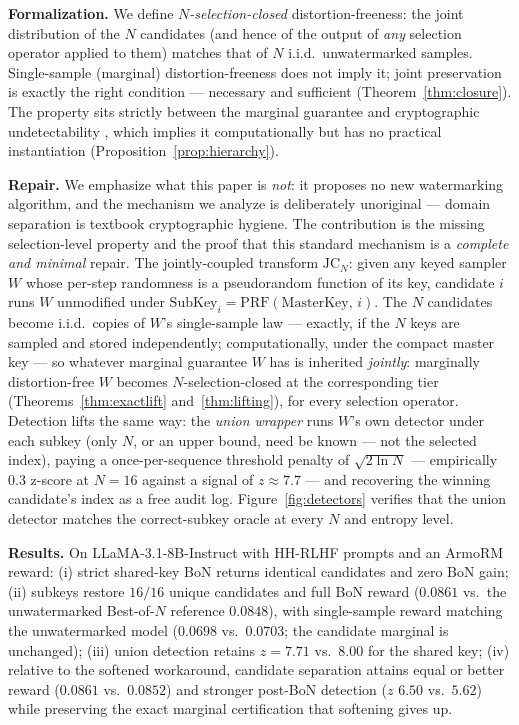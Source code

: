 \documentclass{article} %
\begin{document}
\textbf{Formalization.} We define \emph{$N$-selection-closed} distortion-freeness:
the joint distribution of the $N$ candidates (and hence of the output of \emph{any}
selection operator applied to them) matches that of $N$ i.i.d.\ unwatermarked samples.
Single-sample (marginal) distortion-freeness does not imply it; joint
preservation is exactly the right condition --- necessary and sufficient
(Theorem~\ref{thm:closure}). The property sits strictly between the marginal guarantee and cryptographic
undetectability \citep{christ2023undetectable}, which implies it
computationally but has no practical instantiation
(Proposition~\ref{prop:hierarchy}).

\textbf{Repair.} We emphasize what this paper is \emph{not}: it proposes no
new watermarking algorithm, and the mechanism we analyze is deliberately
unoriginal --- domain separation is textbook cryptographic hygiene. The
contribution is the missing selection-level property and the proof that this
standard mechanism is a \emph{complete and minimal} repair. The jointly-coupled
transform $\mathrm{JC}_N$: given any keyed sampler $W$ whose per-step
randomness is a pseudorandom function of its key, candidate $i$ runs $W$
unmodified under $\mathrm{SubKey}_i=\mathrm{PRF}(\mathrm{MasterKey},\,i)$.
The $N$ candidates become i.i.d.\ copies of $W$'s single-sample law ---
exactly, if the $N$ keys are sampled and stored independently;
computationally, under the compact master key --- so whatever marginal
guarantee $W$ has is inherited \emph{jointly}: marginally distortion-free $W$
becomes $N$-selection-closed at the corresponding tier
(Theorems~\ref{thm:exactlift} and~\ref{thm:lifting}), for every selection
operator.
Detection lifts the same way: the \emph{union wrapper} runs $W$'s own detector
under each subkey (only $N$, or an upper bound, need be known --- not the
selected index), paying a once-per-sequence threshold penalty of
$\sqrt{2\ln N}$ --- empirically $0.3$ z-score at $N{=}16$ against a signal of
$z\approx7.7$ --- and recovering the winning candidate's index as a free audit
log. Figure~\ref{fig:detectors} verifies that the union detector matches the
correct-subkey oracle at every $N$ and entropy level.

\textbf{Results.} On LLaMA-3.1-8B-Instruct with HH-RLHF prompts and an ArmoRM reward:
(i) strict shared-key BoN returns identical candidates and zero BoN gain;
(ii) subkeys restore $16/16$ unique candidates and full BoN reward
($0.0861$ vs.\ the unwatermarked Best-of-$N$ reference $0.0848$), with
single-sample reward matching
the unwatermarked model ($0.0698$ vs.\ $0.0703$; the candidate marginal is
unchanged);
(iii) union detection retains $z=7.71$ vs.\ $8.00$ for the shared key;
(iv) relative to the softened workaround, candidate separation attains equal
or better reward ($0.0861$ vs.\ $0.0852$) and stronger post-BoN detection
($z$ $6.50$ vs.\ $5.62$) while preserving the exact marginal certification
that softening gives up.
\end{document}
